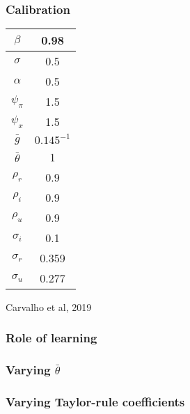 \documentclass{beamer}
\begin{document}
\begin{frame}
	\frametitle{Calibration}

\begin{center}
\begin{tabular}{ c | c }
 $\beta$ & 0.98  \\ \hline
 $\sigma$ & 0.5  \\  \hline
 $\alpha$ & 0.5    \\\hline
 $\psi_{\pi} $& 1.5    \\\hline
 $\psi_x$ & 1.5    \\\hline
 $\bar{g}$ & $0.145^{-1}$    \\ \hline
 $\bar{\theta}$ & 1    \\ \hline
    $\rho_r$ & 0.9    \\ \hline
    $\rho_i$ & 0.9    \\ \hline
    $\rho_u$ & 0.9    \\ \hline
    $\sigma_i$ & 0.1    \\ \hline
    $\sigma_r$ & 0.359    \\ \hline
    $\sigma_u$ & 0.277    \\ \hline
\end{tabular}
\end{center}

Carvalho et al, 2019
\end{frame}
\begin{frame}
	\frametitle{Role of learning}


\end{frame}

\begin{frame}
	\frametitle{Varying $\bar{\theta}$}


\end{frame}

\begin{frame}
	\frametitle{Varying Taylor-rule coefficients}


\end{frame}



%
\end{document}

